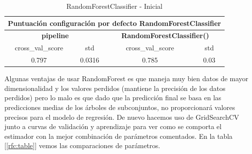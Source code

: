 \documentclass[12pt,twoside]{report}
\begin{document}
\begin{table}[h]
\begin{center}
  \begin{tabular}{|c|c|c|c|}
  \hline
    \multicolumn{4}{|c|}{\textbf{Puntuación configuración por defecto RandomForestClassifier}} \\  
    \hline
    \multicolumn{2}{|c|}{\textbf{pipeline}} & \multicolumn{2}{|c|}{\textbf{RandomForestClassifier()}}\\    
    \hline
   cross\_val\_score & std & cross\_val\_score & std  \\ 
   \hline
0.797 & 0.0316 & 0.785 & 0.03  \\ 
\hline
  \end{tabular}
  \end{center}
\caption{RandomForestClassifier - Inicial}
\label{rfc:inicial}
\end{table}

Algunas ventajas de usar RandomForest es que maneja muy bien datos de mayor dimensionalidad y los valores perdidos (mantiene la precisión de los datos perdidos) pero lo malo es que dado que la predicción final se basa en las predicciones medias de los árboles de subconjuntos, no proporcionará valores precisos para el modelo de regresión. De nuevo hacemos uso de GridSearchCV junto a curvas de validación y aprendizaje para ver como se comporta el estimador con la mejor combinación de parámetros comentados. En la tabla [\ref{rfc:table}] vemos las comparaciones de parámetros.
\end{document}
